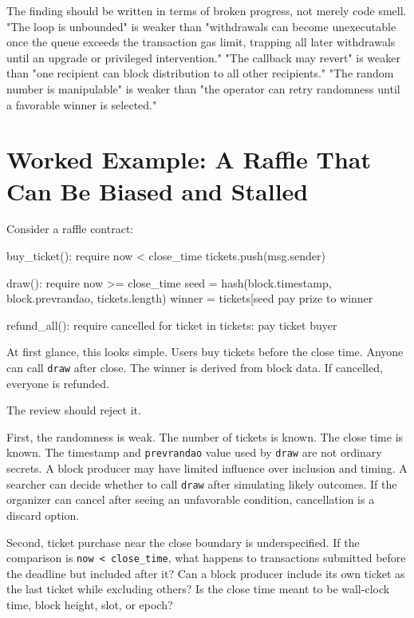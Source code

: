 The finding should be written in terms of broken progress, not merely code smell. "The loop is unbounded" is weaker than "withdrawals can become unexecutable once the queue exceeds the transaction gas limit, trapping all later withdrawals until an upgrade or privileged intervention." "The callback may revert" is weaker than "one recipient can block distribution to all other recipients." "The random number is manipulable" is weaker than "the operator can retry randomness until a favorable winner is selected."

\section{Worked Example: A Raffle That Can Be Biased and Stalled}

Consider a raffle contract:

\begin{codeblock}
buy_ticket():
    require now < close_time
    tickets.push(msg.sender)

draw():
    require now >= close_time
    seed = hash(block.timestamp, block.prevrandao, tickets.length)
    winner = tickets[seed %
    pay prize to winner

refund_all():
    require cancelled
    for ticket in tickets:
        pay ticket buyer
\end{codeblock}

At first glance, this looks simple. Users buy tickets before the close time. Anyone can call \texttt{draw} after close. The winner is derived from block data. If cancelled, everyone is refunded.

The review should reject it.

First, the randomness is weak. The number of tickets is known. The close time is known. The timestamp and \texttt{prevrandao} value used by \texttt{draw} are not ordinary secrets. A block producer may have limited influence over inclusion and timing. A searcher can decide whether to call \texttt{draw} after simulating likely outcomes. If the organizer can cancel after seeing an unfavorable condition, cancellation is a discard option.

Second, ticket purchase near the close boundary is underspecified. If the comparison is \texttt{now < close\_time}, what happens to transactions submitted before the deadline but included after it? Can a block producer include its own ticket as the last ticket while excluding others? Is the close time meant to be wall-clock time, block height, slot, or epoch?

